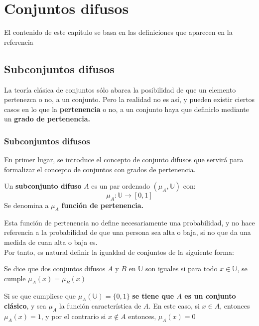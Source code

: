 
\chapter{Conjuntos difusos}
El contenido de este capítulo se basa en las definiciones que aparecen en la referencia \cite{fuzzyintro}

\section{Subconjuntos difusos}
La teoría clásica de conjuntos sólo abarca la posibilidad de que un elemento pertenezca o no, a un conjunto. Pero la realidad no es así, y pueden existir ciertos casos en lo que la \textbf{pertenencia} o no, a un conjunto haya que definirlo mediante un \textbf{grado de pertenencia.}

\subsection{Subconjuntos difusos}
En primer lugar, se introduce el concepto de conjunto difusos que servirá para formalizar el concepto de conjuntos con grados de pertenencia.

\begin{definicion}
  \label{def:subconjunto_difuso}
  
  Un \textbf{subconjunto difuso} $A$ es un par ordenado $(\mu_A, \mathbb{U})$ con:
  \[
  \mu_A : \mathbb{U} \longrightarrow [0,1]
  \]
  Se denomina a $\mu_A$ \textbf{función de pertenencia.}
\end{definicion}

Esta función de pertenencia no define necesariamente una probabilidad, y no hace referencia a la probabilidad de que una persona sea alta o baja, si no que da una medida de cuan alta o baja es.\\

Por tanto, es natural definir la igualdad de conjuntos de la siguiente forma:

\begin{definicion}
  \label{def:igualdad}
  Se dice que dos conjuntos difusos $A$ y $B$ en $\mathbb{U}$ son iguales si para todo $x \in \mathbb{U}$, se cumple $\mu_A(x) = \mu_B(x)$
\end{definicion}

Si se que cumpliese que $\mu_A(\mathbb{U})=\{0, 1\}$ \textbf{se tiene que $A$ es un conjunto clásico}, y sea $\mu_A$ la función característica de $A$. En este caso, si $x \in A$, entonces $\mu_A(x)=1$, y por el contrario si $x \notin A$ entonces, $\mu_A(x)=0$

